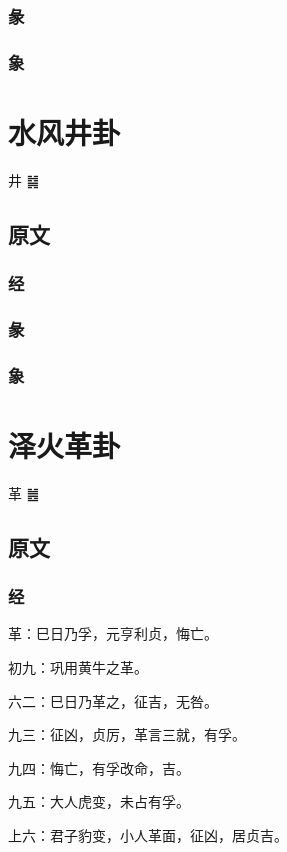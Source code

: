 \documentclass[12pt,oneside]{book}
\begin{document}
\subsection{彖}

\subsection{象}

\chapter{水风井卦}
井 {\Large ䷯}

\section{原文}

\subsection{经}

\subsection{彖}

\subsection{象}

\chapter{泽火革卦}
革 {\Large ䷰}

\section{原文}

\subsection{经}
革：巳日乃孚，元亨利贞，悔亡。

初九：巩用黄牛之革。

六二：巳日乃革之，征吉，无咎。

九三：征凶，贞厉，革言三就，有孚。

九四：悔亡，有孚改命，吉。

九五：大人虎变，未占有孚。

上六：君子豹变，小人革面，征凶，居贞吉。
\end{document}
